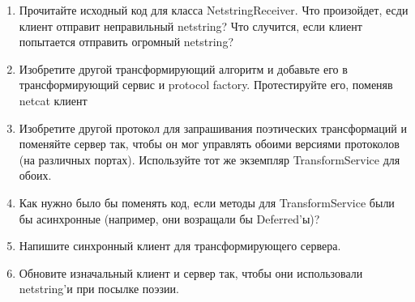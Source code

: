 \begin{enumerate}

\item Прочитайте исходный код для класса NetstringReceiver. Что 
произойдет, есди клиент отправит неправильный netstring? Что 
случится, если клиент попытается отправить огромный netstring?

\item Изобретите другой трансформирующий алгоритм и добавьте его в 
трансформирующий сервис и protocol factory. Протестируйте его, поменяв 
netcat клиент

\item Изобретите другой протокол для запрашивания поэтических 
трансформаций и поменяйте сервер так, чтобы он мог управлять 
обоими версиями протоколов (на различных портах). Используйте 
тот же экземпляр TransformService для обоих.

\item Как нужно было бы поменять код, если методы 
для TransformService были бы асинхронные (например, они возращали бы Deferred'ы)? 

\item Напишите синхронный клиент для трансформирующего сервера.

\item Обновите изначальный клиент и сервер так, чтобы они использовали 
netstring'и при посылке поэзии. 

\end{enumerate}

